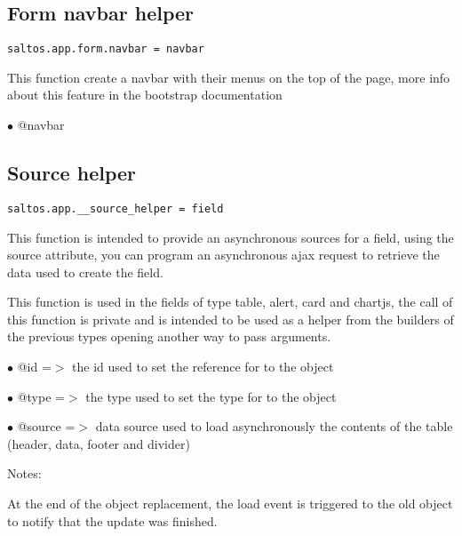 \documentclass[a4paper]{book}
\begin{document}
\hypertarget{toc414}{}
\subsection{Form navbar helper}

\begin{lstlisting}
saltos.app.form.navbar = navbar
\end{lstlisting}

This function create a navbar with their menus on the top of the page, more
info about this feature in the bootstrap documentation

\begin{compactitem}
\item[\color{myblue}$\bullet$] @navbar
\end{compactitem}

\hypertarget{toc415}{}
\subsection{Source helper}

\begin{lstlisting}
saltos.app.__source_helper = field
\end{lstlisting}

This function is intended to provide an asynchronous sources for a field, using the source attribute,
you can program an asynchronous ajax request to retrieve the data used to create the field.

This function is used in the fields of type table, alert, card and chartjs, the call of this function
is private and is intended to be used as a helper from the builders of the previous types opening
another way to pass arguments.

\begin{compactitem}
\item[\color{myblue}$\bullet$] @id     =$>$ the id used to set the reference for to the object
\item[\color{myblue}$\bullet$] @type   =$>$ the type used to set the type for to the object
\item[\color{myblue}$\bullet$] @source =$>$ data source used to load asynchronously the contents of the table (header, data,
           footer and divider)
\end{compactitem}

Notes:

At the end of the object replacement, the load event is triggered to the old object to notify
that the update was finished.
\end{document}
